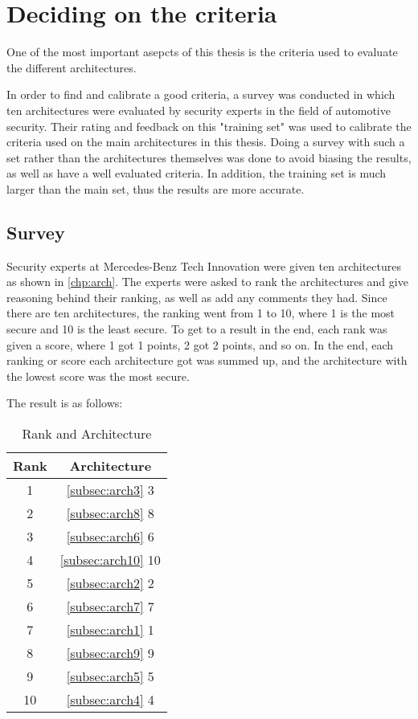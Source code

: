 \chapter{Deciding on the criteria}
\label{chp:criteria}

One of the most important asepcts of this thesis is the criteria used to evaluate the different architectures.

In order to find and calibrate a good criteria, a survey was conducted in which ten architectures were evaluated by security experts in the field of automotive security.
Their rating and feedback on this "training set" was used to calibrate the criteria used on the main architectures in this thesis.
Doing a survey with such a set rather than the architectures themselves was done to avoid biasing the results, as well as have a well evaluated criteria.
In addition, the training set is much larger than the main set, thus the results are more accurate.

\section{Survey}
\label{sec:survey}

Security experts at Mercedes-Benz Tech Innovation were given ten architectures as shown in \ref{chp:arch}.
The experts were asked to rank the architectures and give reasoning behind their ranking, as well as add any comments they had.
Since there are ten architectures, the ranking went from 1 to 10, where 1 is the most secure and 10 is the least secure.
To get to a result in the end, each rank was given a score, where 1 got 1 points, 2 got 2 points, and so on.
In the end, each ranking or score each architecture got was summed up, and the architecture with the lowest score was the most secure.

The result is as follows:

\begin{table}[h]
    \centering
    \caption{Rank and Architecture}
    \begin{tabular}{ |c|c| } 
    \hline
    Rank & Architecture \\
    \hline
    1 & \ref{subsec:arch3} 3\\
    2 & \ref{subsec:arch8} 8\\
    3 & \ref{subsec:arch6} 6\\
    4 & \ref{subsec:arch10} 10\\
    5 & \ref{subsec:arch2} 2\\
    6 & \ref{subsec:arch7} 7\\
    7 & \ref{subsec:arch1} 1\\
    8 & \ref{subsec:arch9} 9\\
    9 & \ref{subsec:arch5} 5\\
    10 & \ref{subsec:arch4} 4\\
    \hline
    \end{tabular}
\end{table}

